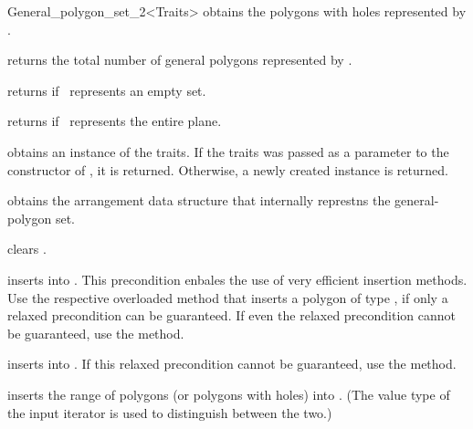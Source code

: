 \begin{ccRefClass}{General_polygon_set_2<Traits>}
  {obtains the polygons with holes represented by \ccVar.}
  
  {returns the total number of general polygons represented by \ccVar.}

  {returns  if \ccVar\ represents an empty set.}

  {returns  if \ccVar\ represents the entire plane.}

  {obtains an instance of the traits. If the traits was passed as a
  parameter to the constructor of \ccVar, it is returned. Otherwise, a
  newly created instance is returned.}

  {obtains the arrangement data structure that internally represtns the
  general-polygon set.}

\ccModifiers
\ccThreeToTwo

  {clears \ccVar.}

  {inserts  into \ccVar.
   This precondition enbales the use of very efficient insertion methods.
   Use the respective overloaded method that inserts a polygon of type 
   , if only a relaxed precondition can be
   guaranteed. If even the relaxed precondition cannot be guaranteed, use
   the  method.}

  {inserts  into \ccVar.
   If this relaxed precondition cannot be guaranteed, use the  
   method.}

  {inserts the range of polygons (or polygons with holes) into \ccVar. (The
   value type of the input iterator is used to distinguish between the two.)
   }


\end{ccRefClass}
